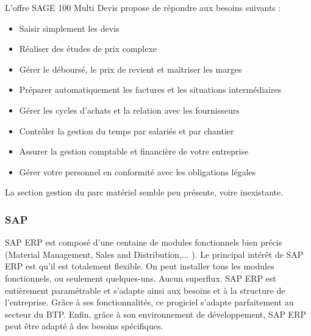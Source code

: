 L'offre SAGE 100 Multi Devis propose de répondre aux besoins suivants :
\begin{itemize}
    \item Saisir simplement les devis
    \item Réaliser des études de prix complexe
    \item Gérer le déboursé, le prix de revient et maîtriser les marges
    \item Préparer automatiquement les factures et les situations intermédiaires
    \item Gérer les cycles d’achats et la relation avec les fournisseurs
    \item Contrôler la gestion du temps par salariés et par chantier
    \item Assurer la gestion comptable et financière de votre entreprise
    \item Gérer votre personnel en conformité avec les obligations légales\\
\end{itemize}

La section gestion du parc matériel semble peu présente, voire inexistante.
				\subsubsection{SAP}

				SAP ERP est composé d'une centaine de modules fonctionnels bien précis (Material Management, Sales and Distribution,... ). 
Le principal intérêt de SAP ERP est qu'il est totalement flexible. On peut installer tous les modules fonctionnels, ou seulement quelques-uns. 
Aucun superflux. SAP ERP est entièrement paramétrable et s'adapte ainsi aux besoins et à la structure de l'entreprise. 
Grâce à ses fonctionnalités, ce progiciel s'adapte parfaitement au secteur du BTP. 
Enfin, grâce à son environnement de développement, SAP ERP peut être adapté à des besoins spécifiques.\\
